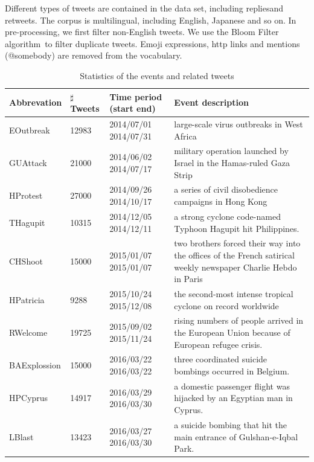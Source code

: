 \documentclass[envcountsame]{llncs}
\begin{document}

Different types of tweets are contained in the data set, including repliesand retweets. The corpus is multilingual, including English, Japanese and so on.
In pre-processing, we first filter non-English tweets. We use the Bloom Filter algorithm~\cite{BloomFilter}to filter duplicate tweets. Emoji expressions, http links and mentions (@somebody) are removed from the vocabulary.
\begin{table}[ht]\label{table:static}
\caption{Statistics of the events and related tweets}
\begin{center}
\tiny
\begin{tabular}{|p{2cm}|p{1.5cm}|p{2cm}|p{7cm}|}
    \hline
    Abbrevation & $\sharp$ Tweets & Time period (start end) &  Event description\\
    \hline
    EOutbreak & 12983 & 2014/07/01  2014/07/31 &  large-scale virus outbreaks in West Africa \\
    \hline
    GUAttack & 21000 & 2014/06/02  2014/07/17 &military operation launched by Israel in the Hamas-ruled Gaza Strip \\
    \hline
    HProtest & 27000 & 2014/09/26  2014/10/17 & a series of civil disobedience campaigns  in Hong Kong \\
    \hline
    THagupit & 10315 & 2014/12/05  2014/12/11 & a strong cyclone code-named Typhoon Hagupit hit Philippines. \\
    \hline
    CHShoot & 15000 & 2015/01/07  2015/01/07 &two brothers forced their way into the offices of the French satirical weekly newspaper Charlie Hebdo in Paris \\
    \hline
    HPatricia & 9288 & 2015/10/24  2015/12/08 &  the second-most intense tropical cyclone on record worldwide \\
    \hline
    RWelcome & 19725 & 2015/09/02  2015/11/24 & rising numbers of people arrived in the European Union because of European refugee crisis.\\
    \hline
    BAExplossion & 15000 & 2016/03/22  2016/03/22 &three coordinated suicide bombings occurred in Belgium.\\
    \hline
    HPCyprus & 14917 & 2016/03/29 2016/03/30 & a domestic passenger flight was hijacked by an Egyptian man in Cyprus.\\
    \hline
    LBlast & 13423 & 2016/03/27  2016/03/30 & a suicide bombing that hit the main entrance of Gulshan-e-Iqbal Park.\\
    \hline
\end{tabular}
\end{center}
\label{default}
\end{table}
\end{document}

